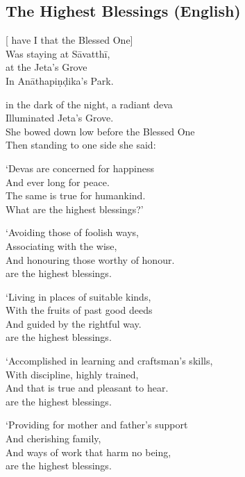 \subsection{The Highest Blessings (English)}


\begin{leader}
\end{leader}

[ have I  that the Blessed One]\\
Was staying at Sāvatthī,\\
 at the Jeta's Grove\\
In Anāthapiṇḍika's Park.

 in the dark of the night, a radiant deva\\
Illuminated  Jeta's Grove.\\
She bowed down low before the Blessed One\\
Then standing to one side she said:

`Devas are concerned for happiness\\
And ever long for peace.\\
The same is true for humankind.\\
What  are the highest blessings?'

`Avoiding those of foolish ways,\\
Associating with the wise,\\
And honouring those worthy of honour.\\
 are the highest blessings.

`Living in places of suitable kinds,\\
With the fruits of past good deeds\\
And guided by the rightful way.\\
 are the highest blessings.

`Accomplished in learning and craftsman's skills,\\%
With discipline, highly trained,\\
And  that is true and pleasant to hear.\\
 are the highest blessings.

`Providing for mother and father's support\\
And cherishing family,\\
And ways of work that harm no being,\\
 are the highest blessings.

